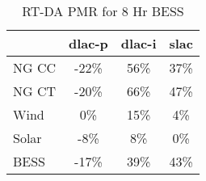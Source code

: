 \begin{table}[htbp]
\centering
\begin{tabular}{lccc}
\toprule
\hline
 & dlac-p & dlac-i & slac \\
\hline
\quad NG CC & -22\% & 56\% & 37\% \\
\quad NG CT & -20\% & 66\% & 47\% \\
\quad Wind & 0\% & 15\% & 4\% \\
\quad Solar & -8\% & 8\% & 0\% \\
\quad BESS & -17\% & 39\% & 43\% \\
\hline
\bottomrule
\end{tabular}
\caption{RT-DA PMR for 8 Hr BESS}
\label{tab:table4_8_Hr_BESS}
\end{table}
